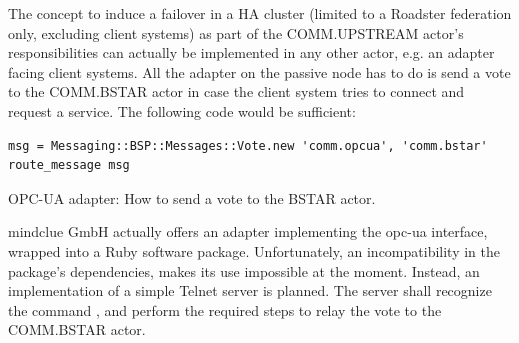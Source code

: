 The concept to induce a failover in a \gls{HA} cluster (limited to a
Roadster federation only, excluding client systems) as part of the
COMM.UPSTREAM actor's responsibilities can actually be implemented in any other
actor, e.g. an adapter facing client systems. All the adapter on the passive
node has to do is send a vote to the COMM.BSTAR actor in case the client system
tries to connect and request a service. The following code would be sufficient:

\begin{listing}[H]
  \begin{verbatim}
msg = Messaging::BSP::Messages::Vote.new 'comm.opcua', 'comm.bstar'
route_message msg
  \end{verbatim}
  \caption{OPC-UA adapter: How to send a vote to the BSTAR actor.}
  \label{lst:approach:opc-ua}
\end{listing}

mindclue GmbH actually offers an adapter implementing the \gls{opc-ua}
interface, wrapped into a Ruby software package. Unfortunately, an
incompatibility in the package's dependencies, makes its use impossible at the
moment. Instead, an implementation of a simple Telnet server is planned. The
server shall recognize the command , and perform the required steps to
relay the vote to the COMM.BSTAR actor.
